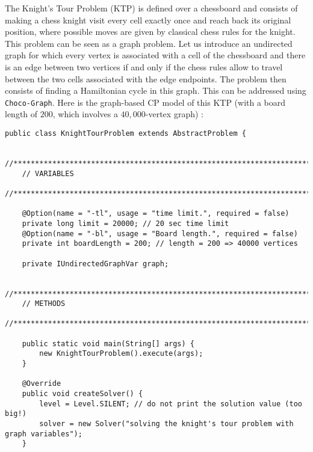 \documentclass{article}
\begin{document}
The Knight's Tour Problem (KTP) is defined over a chessboard and consists of making a chess knight visit every cell exactly once and reach back its original position, where possible moves are given by classical chess rules for the knight. This problem can be seen as a graph problem. Let us introduce an undirected graph for which every vertex is associated with a cell of the chessboard and there is an edge between two vertices if and only if the chess rules allow to travel between the two cells associated with the edge endpoints. The problem then consists of finding a Hamiltonian cycle in this graph. This can be addressed using \texttt{Choco-Graph}. Here is the graph-based CP model of this KTP (with a board length of $200$, which involves a $40,000$-vertex graph) : 
\begin{lstlisting}
public class KnightTourProblem extends AbstractProblem {

	//***********************************************************************************
	// VARIABLES
	//***********************************************************************************

	@Option(name = "-tl", usage = "time limit.", required = false)
	private long limit = 20000; // 20 sec time limit
	@Option(name = "-bl", usage = "Board length.", required = false)
	private int boardLength = 200; // length = 200 => 40000 vertices

	private IUndirectedGraphVar graph;

	//***********************************************************************************
	// METHODS
	//***********************************************************************************

	public static void main(String[] args) {
		new KnightTourProblem().execute(args);
	}

	@Override
	public void createSolver() {
		level = Level.SILENT; // do not print the solution value (too big!)
		solver = new Solver("solving the knight's tour problem with graph variables");
	}


\end{lstlisting}
\end{document}
